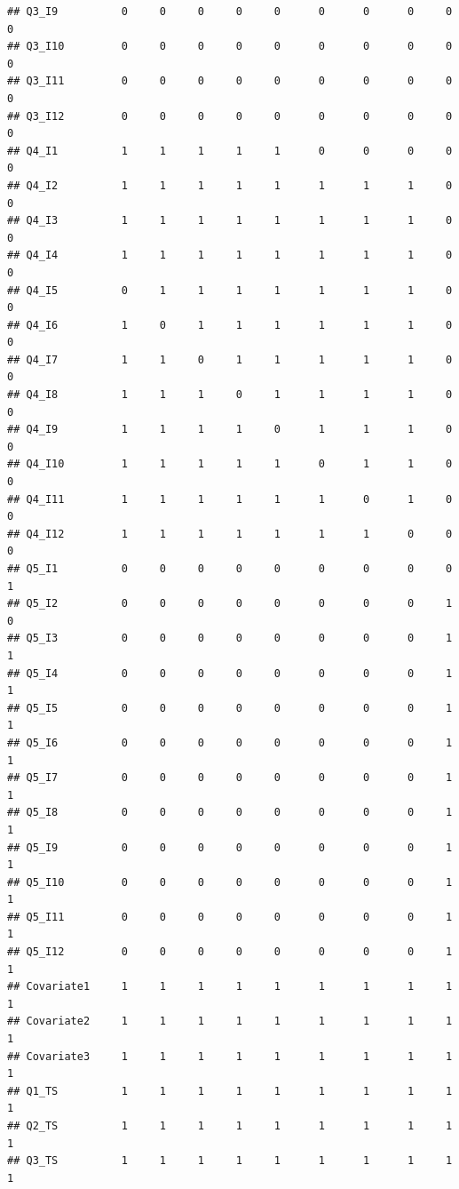 \documentclass[]{book}
\begin{document}
\begin{verbatim}
## Q3_I9          0     0     0     0     0      0      0      0     0     0
## Q3_I10         0     0     0     0     0      0      0      0     0     0
## Q3_I11         0     0     0     0     0      0      0      0     0     0
## Q3_I12         0     0     0     0     0      0      0      0     0     0
## Q4_I1          1     1     1     1     1      0      0      0     0     0
## Q4_I2          1     1     1     1     1      1      1      1     0     0
## Q4_I3          1     1     1     1     1      1      1      1     0     0
## Q4_I4          1     1     1     1     1      1      1      1     0     0
## Q4_I5          0     1     1     1     1      1      1      1     0     0
## Q4_I6          1     0     1     1     1      1      1      1     0     0
## Q4_I7          1     1     0     1     1      1      1      1     0     0
## Q4_I8          1     1     1     0     1      1      1      1     0     0
## Q4_I9          1     1     1     1     0      1      1      1     0     0
## Q4_I10         1     1     1     1     1      0      1      1     0     0
## Q4_I11         1     1     1     1     1      1      0      1     0     0
## Q4_I12         1     1     1     1     1      1      1      0     0     0
## Q5_I1          0     0     0     0     0      0      0      0     0     1
## Q5_I2          0     0     0     0     0      0      0      0     1     0
## Q5_I3          0     0     0     0     0      0      0      0     1     1
## Q5_I4          0     0     0     0     0      0      0      0     1     1
## Q5_I5          0     0     0     0     0      0      0      0     1     1
## Q5_I6          0     0     0     0     0      0      0      0     1     1
## Q5_I7          0     0     0     0     0      0      0      0     1     1
## Q5_I8          0     0     0     0     0      0      0      0     1     1
## Q5_I9          0     0     0     0     0      0      0      0     1     1
## Q5_I10         0     0     0     0     0      0      0      0     1     1
## Q5_I11         0     0     0     0     0      0      0      0     1     1
## Q5_I12         0     0     0     0     0      0      0      0     1     1
## Covariate1     1     1     1     1     1      1      1      1     1     1
## Covariate2     1     1     1     1     1      1      1      1     1     1
## Covariate3     1     1     1     1     1      1      1      1     1     1
## Q1_TS          1     1     1     1     1      1      1      1     1     1
## Q2_TS          1     1     1     1     1      1      1      1     1     1
## Q3_TS          1     1     1     1     1      1      1      1     1     1

\end{verbatim}
\end{document}
